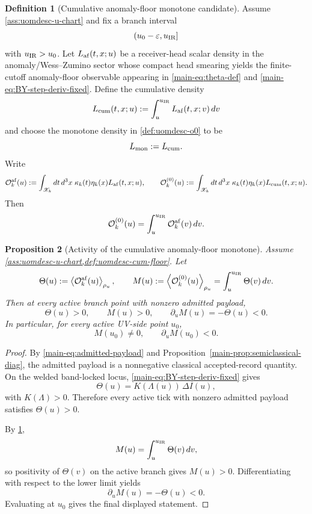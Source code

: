 \documentclass[11pt]{article}
\theoremstyle{definition}
\newtheorem{definition}{Definition}[section]
\theoremstyle{plain}
\newtheorem{proposition}[definition]{Proposition}
\theoremstyle{remark}
\newcommand{\Xscr}{\mathscr X}
\newcommand{\Ozero}{\mathcal O^{(0)}}
\newcommand{\Oaf}{\mathcal O^{\mathrm{af}}}
\newcommand{\pair}[1]{\left\langle #1 \right\rangle}
\begin{document}
\begin{definition}[Cumulative anomaly-floor monotone candidate]
\label{def:uomdesc-cum-floor}
Assume \cref{ass:uomdesc-u-chart} and fix a branch interval
\[
(u_0-\varepsilon,u_{\rm IR}]
\]
with \(u_{\rm IR}>u_0\).
Let \(L_{\rm af}(t,x;u)\) be a receiver-head scalar density in the anomaly/Wess--Zumino sector
whose compact head smearing yields the finite-cutoff anomaly-floor observable appearing in
\eqref{main-eq:theta-def} and \eqref{main-eq:BY-step-deriv-fixed}.
Define the cumulative density
\[
L_{\rm cum}(t,x;u)
:=
\int_u^{u_{\rm IR}}L_{\rm af}(t,x;v)\,dv
\]
and choose the monotone density in \cref{def:uomdesc-o0} to be
\[
L_{\rm mon}:=L_{\rm cum}.
\]
Write
\[
\Oaf_k(u)
:=
\int_{\Xscr_k}dt\,d^3x\;
\kappa_k(t)\eta_k(x)L_{\rm af}(t,x;u),
\qquad
\Ozero_k(u)
:=
\int_{\Xscr_k}dt\,d^3x\;
\kappa_k(t)\eta_k(x)L_{\rm cum}(t,x;u).
\]
Then
\[
\Ozero_k(u)=\int_u^{u_{\rm IR}}\Oaf_k(v)\,dv.
\]
\end{definition}

\begin{proposition}[Activity of the cumulative anomaly-floor monotone]
\label{prop:uomdesc-cum-floor-activity}
Assume \cref{ass:uomdesc-u-chart,def:uomdesc-cum-floor}.
Let
\[
\Theta(u):=\pair{\Oaf_k(u)}_{\rho_u},
\qquad
M(u):=\pair{\Ozero_k(u)}_{\rho_u}
=
\int_u^{u_{\rm IR}}\Theta(v)\,dv.
\]
Then at every active branch point with nonzero admitted payload,
\[
\Theta(u)>0,
\qquad
M(u)>0,
\qquad
\partial_u M(u)=-\Theta(u)<0.
\]
In particular, for every active UV-side point \(u_0\),
\[
M(u_0)\neq 0,
\qquad
\partial_u M(u_0)<0.
\]
\end{proposition}

\begin{proof}
By \eqref{main-eq:admitted-payload} and Proposition~\ref{main-prop:semiclassical-diag}, the
admitted payload is a
nonnegative classical accepted-record quantity.
On the welded band-locked locus, \eqref{main-eq:BY-step-deriv-fixed} gives
\[
\Theta(u)=K(\Lambda(u))\,\Delta I(u),
\]
with \(K(\Lambda)>0\). Therefore every active tick with nonzero admitted payload satisfies
\(
\Theta(u)>0
\).

By \cref{def:uomdesc-cum-floor},
\[
M(u)=\int_u^{u_{\rm IR}}\Theta(v)\,dv,
\]
so positivity of \(\Theta(v)\) on the active branch gives \(M(u)>0\).
Differentiating with respect to the lower limit yields
\[
\partial_u M(u)=-\Theta(u)<0.
\]
Evaluating at \(u_0\) gives the final displayed statement.
\end{proof}
\end{document}
